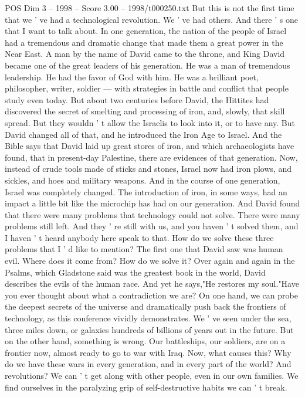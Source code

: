 \begin{textsample}{POS Dim 3 – 1998 – Score 3.00 – 1998/t000250.txt}
But this is not the first time that we ' ve had a technological revolution.
We ' ve had others.
And there ' s one that I want to talk about.
In one generation, the nation of the people of Israel had a tremendous and dramatic change that made them a great power in the Near East.
A man by the name of David came to the throne, and King David became one of the great leaders of his generation.
He was a man of tremendous leadership.
He had the favor of God with him.
He was a brilliant poet, philosopher, writer, soldier — with strategies in battle and conflict that people study even today.
But about two centuries before David, the Hittites had discovered the secret of smelting and processing of iron, and, slowly, that skill spread.
But they wouldn ' t allow the Israelis to look into it, or to have any.
But David changed all of that, and he introduced the Iron Age to Israel.
And the Bible says that David laid up great stores of iron, and which archaeologists have found, that in present-day Palestine, there are evidences of that generation.
Now, instead of crude tools made of sticks and stones, Israel now had iron plows, and sickles, and hoes and military weapons.
And in the course of one generation, Israel was completely changed.
The introduction of iron, in some ways, had an impact a little bit like the microchip has had on our generation.
And David found that there were many problems that technology could not solve.
There were many problems still left.
And they ' re still with us, and you haven ' t solved them, and I haven ' t heard anybody here speak to that.
How do we solve these three problems that I ' d like to mention?
The first one that David saw was human evil.
Where does it come from?
How do we solve it?
Over again and again in the Psalms, which Gladstone said was the greatest book in the world, David describes the evils of the human race.
And yet he says,"He restores my soul."Have you ever thought about what a contradiction we are?
On one hand, we can probe the deepest secrets of the universe and dramatically push back the frontiers of technology, as this conference vividly demonstrates.
We ' ve seen under the sea, three miles down, or galaxies hundreds of billions of years out in the future.
But on the other hand, something is wrong.
Our battleships, our soldiers, are on a frontier now, almost ready to go to war with Iraq.
Now, what causes this?
Why do we have these wars in every generation, and in every part of the world?
And revolutions?
We can ' t get along with other people, even in our own families.
We find ourselves in the paralyzing grip of self-destructive habits we can ' t break.

\end{textsample}
